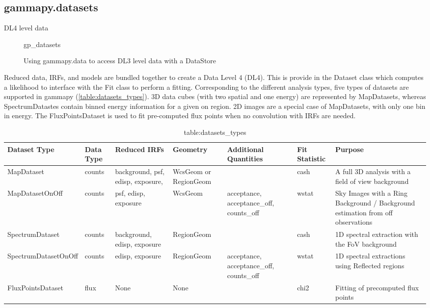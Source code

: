 \subsection{gammapy.datasets}
\label{ssec:gammapy-datasets}
DL4 level data

\begin{figure}

	{gp_datasets}
	\caption{Using gammapy.data to access DL3 level data with a DataStore}
	\label{fig*:minted:gp_datasets}
\end{figure}

Reduced data, IRFs, and models are bundled together to create a Data Level 4 (DL4). This is provide in the Dataset class which computes a likelihood to interface with the Fit class to perform a fitting. Corresponding to the different analysis types, five types of datasets are supported in gammapy (\ref{table:datasets_types}). 3D data cubes (with two spatial and one energy) are represented by MapDatasets, whereas SpectrumDatastes contain binned energy information for a given on region. 2D images are a special case of MapDatasets, with only one bin in energy. The FluxPointsDataset is used to fit pre-computed flux points when no convolution with IRFs are needed.   

\begin{table}[!ht]
    \centering
    \begin{tabular}{|l|l|l|l|l|l|l|}
    \hline
        Dataset Type & Data Type & Reduced IRFs & Geometry & Additional Quantities & Fit Statistic & Purpose \\ \hline
        MapDataset & counts & background, psf, edisp, exposure, & WcsGeom or RegionGeom & ~ & cash & A full 3D analysis with a field of view background \\ \hline
        MapDatasetOnOff & counts & psf, edisp, exposure & WcsGeom & acceptance, acceptance\_off, counts\_off & wstat & Sky Images with a Ring Background / Background estimation from off observations \\ \hline
        SpectrumDataset & counts & background, edisp, exposure & RegionGeom & ~ & cash & 1D spectral extraction with the FoV background \\ \hline
        SpectrumDatasetOnOff & counts & edisp, exposure & RegionGeom & acceptance, acceptance\_off, counts\_off & wstat & 1D spectral extractions using Reflected regions \\ \hline
        FluxPointsDataset & flux & None & None & ~ & chi2 & Fitting of precomputed flux points \\ \hline
    \end{tabular}
    \caption{table:datasets_types}
\end{table}


